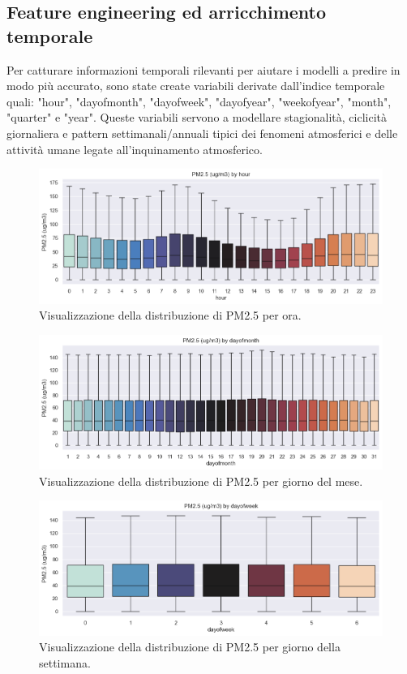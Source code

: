 \documentclass[a4paper,12pt]{report}
\begin{document}
	\subsection{Feature engineering ed arricchimento temporale}
	Per catturare informazioni temporali rilevanti per aiutare i modelli a predire in modo più accurato, sono state create variabili derivate dall'indice temporale quali: "hour", "dayofmonth", "dayofweek", "dayofyear", "weekofyear", "month", "quarter" e "year". Queste variabili servono a modellare stagionalità, ciclicità giornaliera e pattern settimanali/annuali tipici dei fenomeni atmosferici e delle attività umane legate all'inquinamento atmosferico.
	
	\begin{figure}[H]
		\centering
		\includegraphics[width=1.0\textwidth]{img/byhour_pm.png}
		\caption{Visualizzazione della distribuzione di PM2.5 per ora.}
	\end{figure}
	\begin{figure}[H]
		\centering
		\includegraphics[width=1.0\textwidth]{img/bydayofmonth_pm.png}
		\caption{Visualizzazione della distribuzione di PM2.5 per giorno del mese.}
	\end{figure}
	\begin{figure}[H]
		\centering
		\includegraphics[width=1.0\textwidth]{img/bydayofweek_pm.png}
		\caption{Visualizzazione della distribuzione di PM2.5 per giorno della settimana.}
	\end{figure}
\end{document}
